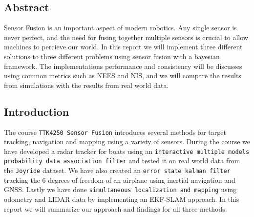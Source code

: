 \subsection{Abstract}
Sensor Fusion is an important aspect of modern robotics. Any single sensor is never perfect, and the need for fusing together multiple sensors is crucial to allow machines to percieve our world. In this report we will implement three different solutions to three different problems using sensor fusion with a bayesian framework. The implementations performance and consistency will be discusses using common metrics such as NEES and NIS, and we will compare the results from simulations with the results from real world data.
\subsection{Introduction}
The course \texttt{TTK4250 Sensor Fusion} introduces several methods for target tracking, navigation and mapping using a variety of sensors. During the course we have developed a radar tracker for boats using an \texttt{interactive multiple models probability data association filter} and tested it on real world data from the \texttt{Joyride} dataset. We have also created an \texttt{error state kalman filter} tracking the 6 degrees of freedom of an airplane using inertial navigation and GNSS. Lastly we have done \texttt{simultaneous localization and mapping} using odometry and LIDAR data by implementing an EKF-SLAM approach. In this report we will summarize our approach and findings for all three methods.
